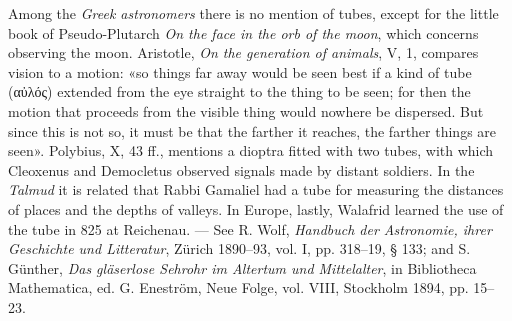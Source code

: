 \documentclass[11pt]{article}
\begin{document}
\par Among the \emph{Greek astronomers} there is no mention of tubes, except for the little book of Pseudo-Plutarch \emph{On the face in the orb of the moon}, which concerns observing the moon. Aristotle, \emph{On the generation of animals}, V, 1, compares vision to a motion: «so things far away would be seen best if a kind of tube ({\greekfont αὐλός}) extended from the eye straight to the thing to be seen; for then the motion that proceeds from the visible thing would nowhere be dispersed. But since this is not so, it must be that the farther it reaches, the farther things are seen». Polybius, X, 43 ff., mentions a dioptra fitted with two tubes, with which Cleoxenus and Democletus observed signals made by distant soldiers. In the \emph{Talmud} it is related that Rabbi Gamaliel had a tube for measuring the distances of places and the depths of valleys. In Europe, lastly, Walafrid learned the use of the tube in 825 at Reichenau. — See R. Wolf, \emph{Handbuch der Astronomie, ihrer Geschichte und Litteratur}, Zürich 1890–93, vol. I, pp. 318–19, § 133; and S. Günther, \emph{Das gläserlose Sehrohr im Altertum und Mittelalter}, in Bibliotheca Mathematica, ed. G. Eneström, Neue Folge, vol. VIII, Stockholm 1894, pp. 15–23.\par
\end{document}
